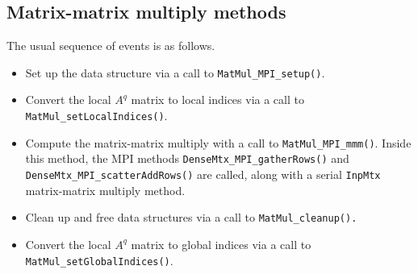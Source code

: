 \subsection{Matrix-matrix multiply methods}
\label{subsection:MPI:proto:mmm}
\par
The usual sequence of events is as follows.
\begin{itemize}
\item
Set up the data structure via a call to {\tt MatMul\_MPI\_setup()}.
\item
Convert the local $A^q$ matrix to local indices via a call to
{\tt MatMul\_setLocalIndices()}.
\item
Compute the matrix-matrix multiply with a call to 
{\tt MatMul\_MPI\_mmm()}.
Inside this method, the MPI methods {\tt DenseMtx\_MPI\_gatherRows()}
and {\tt DenseMtx\_MPI\_scatterAddRows()} are called, along with
a serial {\tt InpMtx} matrix-matrix multiply method.
\item
Clean up and free data structures via a call to
{\tt MatMul\_cleanup().}
\item
Convert the local $A^q$ matrix to global indices via a call to
{\tt MatMul\_setGlobalIndices()}.
\end{itemize}
